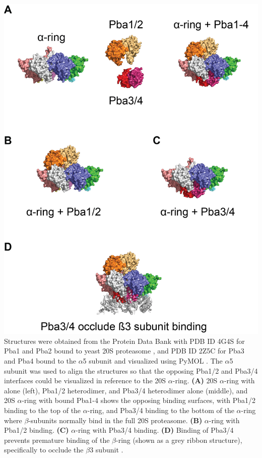 \begin{FPfigure}
	\centering
	\includegraphics[width=\columnwidth]{intro/pba14structure.png}
	{Structures were obtained from the Protein Data Bank with PDB ID 4G4S for Pba1 and Pba2 bound to yeast 20S proteasome \citep{stadtmueller12}, and PDB ID 2Z5C for Pba3 and Pba4 bound to the $\alpha$5 subunit\citep{yashiroda08} and visualized using PyMOL \citep{PyMOL}. The $\alpha$5 subunit was used to align the structures so that the opposing Pba1/2 and Pba3/4 interfaces could be visualized in reference to the 20S $\alpha$-ring. \textbf{(A)} 20S $\alpha$-ring with alone (left), Pba1/2 heterodimer, and Pba3/4 heterodimer alone (middle), and 20S $\alpha$-ring with bound Pba1-4 shows the opposing binding surfaces, with Pba1/2 binding to the top of the $\alpha$-ring, and Pba3/4 binding to the bottom of the $\alpha$-ring where $\beta$-subunits normally bind in the full 20S proteasome. \textbf{(B)} $\alpha$-ring with Pba1/2 binding. \textbf{(C)} $\alpha$-ring with Pba3/4 binding. \textbf{(D)} Binding of Pba3/4 prevents premature binding of the $\beta$-ring (shown as a grey ribbon structure), specifically to occlude the $\beta$3 subunit \citep{yashiroda08}.}
	\label{fig:pba14structure}
\end{FPfigure}
	

